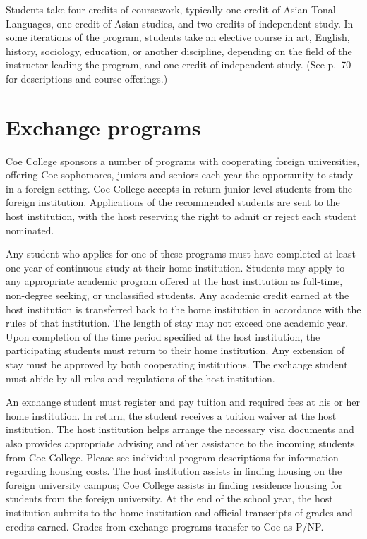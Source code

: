 \documentclass[
  letterpaper,
]{scrbook}
\begin{document}
Students take four credits of coursework, typically one credit of Asian
Tonal Languages, one credit of Asian studies, and two credits of
independent study. In some iterations of the program, students take an
elective course in art, English, history, sociology, education, or
another discipline, depending on the field of the instructor leading the
program, and one credit of independent study. (See p.~70 for
descriptions and course offerings.)

\section{Exchange programs}\label{exchange-programs}

Coe College sponsors a number of programs with cooperating foreign
universities, offering Coe sophomores, juniors and seniors each year the
opportunity to study in a foreign setting. Coe College accepts in return
junior-level students from the foreign institution. Applications of the
recommended students are sent to the host institution, with the host
reserving the right to admit or reject each student nominated.

Any student who applies for one of these programs must have completed at
least one year of continuous study at their home institution. Students
may apply to any appropriate academic program offered at the host
institution as full-time, non-degree seeking, or unclassified students.
Any academic credit earned at the host institution is transferred back
to the home institution in accordance with the rules of that
institution. The length of stay may not exceed one academic year. Upon
completion of the time period specified at the host institution, the
participating students must return to their home institution. Any
extension of stay must be approved by both cooperating institutions. The
exchange student must abide by all rules and regulations of the host
institution.

An exchange student must register and pay tuition and required fees at
his or her home institution. In return, the student receives a tuition
waiver at the host institution. The host institution helps arrange the
necessary visa documents and also provides appropriate advising and
other assistance to the incoming students from Coe College. Please see
individual program descriptions for information regarding housing costs.
The host institution assists in finding housing on the foreign
university campus; Coe College assists in finding residence housing for
students from the foreign university. At the end of the school year, the
host institution submits to the home institution and official
transcripts of grades and credits earned. Grades from exchange programs
transfer to Coe as P/NP.
\end{document}
